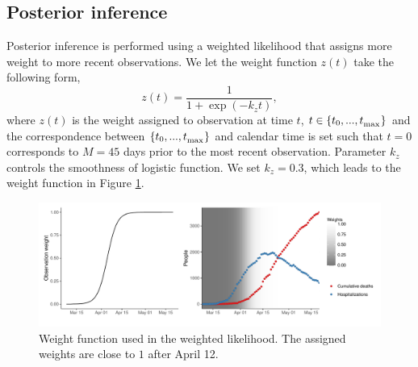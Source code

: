 \documentclass[11pt]{article}
\begin{document}
\subsection{Posterior inference} 

Posterior inference is performed using a weighted likelihood that assigns more weight to more recent observations. We let the weight function $z(t)$ take the following form, 
\begin{equation}
z(t) = \frac{1}{1 + \exp(- k_z t)}, 
\label{eq:datweight}
\end{equation}
where $z(t)$ is the weight assigned to observation at time $t$, $t \in \{t_0, ..., t_\textsubscript{max} \}$ and the correspondence between $\{t_0, ..., t_\textsubscript{max} \}$ and calendar time is set such that $t=0$ corresponds to $M = 45$ days prior to the most recent observation. Parameter $k_z$ controls the smoothness of logistic function. We set $k_z = 0.3$, which leads to the weight function in Figure \ref{fig:datweights}. 


\begin{figure} %
	\centering
	\includegraphics[width=\textwidth]{figures/data_weights.pdf}
	\caption{Weight function used in the weighted likelihood. The assigned weights are close to $1$ after April 12. }
	\label{fig:datweights}
\end{figure}
\end{document}
